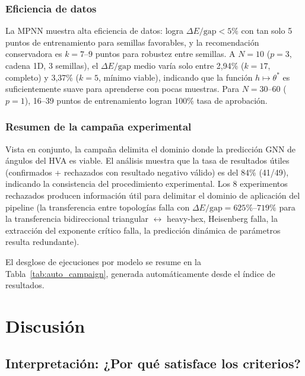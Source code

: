 \documentclass[11pt,a4paper,spanish]{book}
\begin{document}
\subsection{Eficiencia de datos}
\label{sec:eficiencia_datos}

La MPNN muestra alta eficiencia de datos: logra $\Delta E/\text{gap} < 5\%$ con tan solo 5 puntos de entrenamiento para semillas favorables, y la recomendación conservadora es $k = 7$--$9$ puntos para robustez entre semillas. A $N = 10$ ($p = 3$, cadena 1D, 3 semillas), el $\Delta E/\text{gap}$ medio varía solo entre 2,94\% ($k = 17$, completo) y 3,37\% ($k = 5$, mínimo viable), indicando que la función $h \mapsto \theta^*$ es suficientemente suave para aprenderse con pocas muestras. Para $N = 30$--$60$ ($p = 1$), 16--39 puntos de entrenamiento logran 100\% tasa de aprobación.

\subsection{Resumen de la campaña experimental}
\label{sec:resumen_campana}

Vista en conjunto, la campaña delimita el dominio donde la predicción GNN de ángulos del HVA es viable. El análisis muestra que la tasa de resultados útiles (confirmados + rechazados con resultado negativo válido) es del 84\% (41/49), indicando la consistencia del procedimiento experimental. Los 8 experimentos rechazados producen información útil para delimitar el dominio de aplicación del pipeline (la transferencia entre topologías falla con $\Delta E/\text{gap} = 625\%$--$719\%$ para la transferencia bidireccional triangular $\leftrightarrow$ heavy-hex, Heisenberg falla, la extracción del exponente crítico falla, la predicción dinámica de parámetros resulta redundante).

El desglose de ejecuciones por modelo se resume en la Tabla~\ref{tab:auto_campaign}, generada automáticamente desde el índice de resultados.




\chapter{Discusión}

\section{Interpretación: ¿Por qué satisface los criterios?}
\label{sec:interpretacion}
\end{document}
